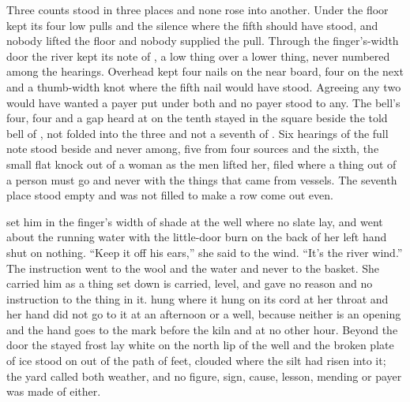 Three counts stood in three places and none rose into another. Under the floor  kept its four low pulls and the silence where the fifth should have stood, and nobody lifted the floor and nobody supplied the pull. Through the finger's-width door the river kept its note of , a low thing over a lower thing, never numbered among the hearings. Overhead  kept four nails on the near board, four on the next and a thumb-width knot where the fifth nail would have stood. Agreeing any two would have wanted a payer put under both and no payer stood to any. The bell's four, four and a gap heard at  on the tenth stayed in the square beside the told bell of , not folded into the three and not a seventh of . Six hearings of the full note stood beside and never among, five from four sources and the sixth, the small flat knock out of a woman as the men lifted her, filed where a thing out of a person must go and never with the things that came from vessels. The seventh place stood empty and was not filled to make a row come out even.

 set him in the finger's width of shade at the well where no slate lay, and went about the running water with the little-door burn on the back of her left hand shut on nothing. “Keep it off his ears,” she said to the wind. “It's the river wind.” The instruction went to the wool and the water and never to the basket. She carried him as a thing set down is carried, level, and gave no reason and no instruction to the thing in it.  hung where it hung on its cord at her throat and her hand did not go to it at an afternoon or a well, because neither is an opening and the hand goes to the mark before the kiln and at no other hour. Beyond the door the stayed frost lay white on the north lip of the well and the broken plate of ice stood on  out of the path of feet, clouded where the silt had risen into it; the yard called both weather, and no figure, sign, cause, lesson, mending or payer was made of either.


